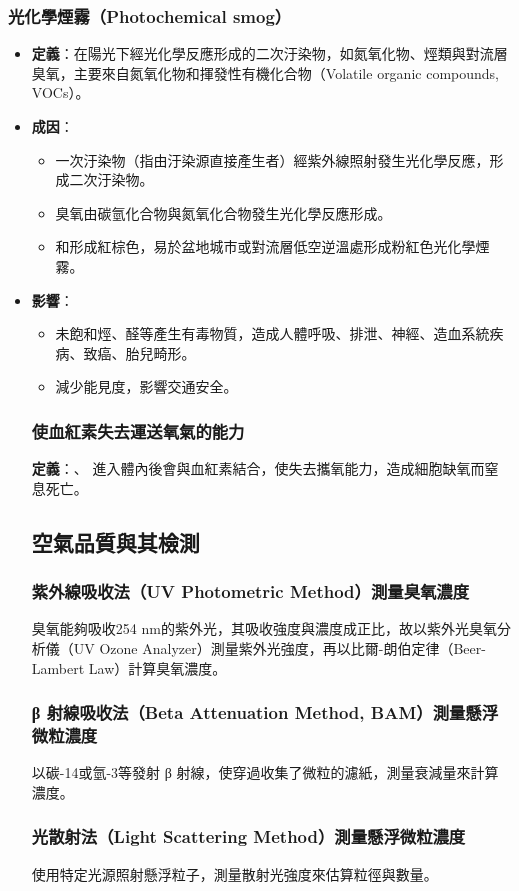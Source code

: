 \documentclass[a4paper,12pt]{report}
\begin{document}
\subsubsection{光化學煙霧（Photochemical smog）}
\begin{itemize}
    \item \textbf{定義}：在陽光下經光化學反應形成的二次汙染物，如氮氧化物、烴類與對流層臭氧，主要來自氮氧化物和揮發性有機化合物（Volatile organic compounds, VOCs）。
    \item \textbf{成因}：
\begin{itemize}
\item 一次汙染物（指由汙染源直接產生者）經紫外線照射發生光化學反應，形成二次汙染物。
\item 臭氧由碳氫化合物與氮氧化合物發生光化學反應形成。
\item {}和形成紅棕色，易於盆地城市或對流層低空逆溫處形成粉紅色光化學煙霧。
\end{itemize}
\item \textbf{影響}：
\begin{itemize}
\item 未飽和烴、醛等產生有毒物質，造成人體呼吸、排泄、神經、造血系統疾病、致癌、胎兒畸形。
\item 減少能見度，影響交通安全。
\end{itemize}
\eit
\subsubsection{使血紅素失去運送氧氣的能力}
\textbf{定義}：、 進入體內後會與血紅素結合，使失去攜氧能力，造成細胞缺氧而窒息死亡。
\subsection{空氣品質與其檢測}
\subsubsection{紫外線吸收法（UV Photometric Method）測量臭氧濃度}
臭氧能夠吸收254 nm的紫外光，其吸收強度與濃度成正比，故以紫外光臭氧分析儀（UV Ozone Analyzer）測量紫外光強度，再以比爾-朗伯定律（Beer-Lambert Law）計算臭氧濃度。
\subsubsection{β 射線吸收法（Beta Attenuation Method, BAM）測量懸浮微粒濃度}
以碳-14或氫-3等發射 β 射線，使穿過收集了微粒的濾紙，測量衰減量來計算濃度。
\subsubsection{光散射法（Light Scattering Method）測量懸浮微粒濃度}
使用特定光源照射懸浮粒子，測量散射光強度來估算粒徑與數量。

\end{itemize}
\end{document}
